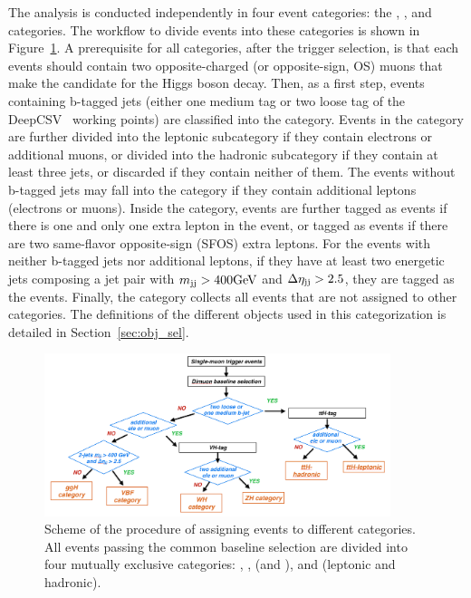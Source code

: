 The \hmm analysis is conducted independently in four event categories: the \ggH, \qqH, \VH and \ttH categories.
The workflow to divide events into these categories is shown in Figure~\ref{fig:event_categories}.
A prerequisite for all categories, after the trigger selection, 
is that each events should contain two opposite-charged (or opposite-sign, OS) muons that make the candidate for the Higgs boson decay. 
Then, as a first step, events containing b-tagged jets (either one medium tag or two loose tag of the DeepCSV~\cite{Sirunyan:2017ezt} working points) are classified into the \ttH category.
Events in the \ttH category are further divided into the \ttH leptonic subcategory if they contain electrons or additional muons,
or divided into the \ttH hadronic subcategory if they contain at least three jets,
or discarded if they contain neither of them.
The events without b-tagged jets may fall into the \VH category if they contain additional leptons (electrons or muons).
Inside the \VH category, events are further tagged as \WH events if there is one and only one extra lepton in the event, 
or tagged as \ZH events if there are two same-flavor opposite-sign (SFOS) extra leptons.
For the events with neither b-tagged jets nor additional leptons, 
if they have at least two energetic jets composing a jet pair with $m_{\mathrm{jj}}>400\mbox{GeV}$ and $\Delta\eta_{\mathrm{jj}}>2.5$, 
they are tagged as the \qqH events.
Finally, the \ggH category collects all events that are not assigned to other categories. 
The definitions of the different objects used in this categorization is detailed in Section~\ref{sec:obj_sel}.

\begin{figure}[!htb]
    \centering
    \captionsetup{justification=justified}
    \includegraphics[width=0.9\textwidth]{pics/category_scheme.png}
    \caption{Scheme of the procedure of assigning events to different categories. All events passing the common baseline selection
             are divided into four mutually exclusive categories: \ggH, \qqH, \VH (\WH and \ZH), and \ttH (leptonic and hadronic).}
    \label{fig:event_categories}
\end{figure}

